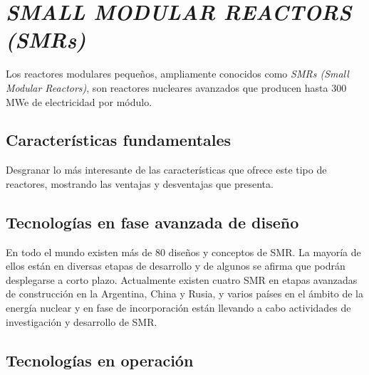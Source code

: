 \newpage
\section{\emph{SMALL MODULAR REACTORS (SMRs)}} \label{small_modular_reactors}

Los reactores modulares pequeños, ampliamente conocidos como \emph{SMRs (Small Modular Reactors)}, son reactores nucleares avanzados que producen hasta 300 MWe de electricidad por módulo. 

\subsection{Características fundamentales}

Desgranar lo más interesante de las características que ofrece este tipo de reactores, mostrando las ventajas y desventajas que presenta.

\subsection{Tecnologías en fase avanzada de diseño}

En todo el mundo existen más de 80 diseños y conceptos de SMR. La mayoría de ellos están en diversas etapas de desarrollo y de algunos se afirma que podrán desplegarse a corto plazo. Actualmente existen cuatro SMR en etapas avanzadas de construcción en la Argentina, China y Rusia, y varios países en el ámbito de la energía nuclear y en fase de incorporación están llevando a cabo actividades de investigación y desarrollo de SMR.

\subsection{Tecnologías en operación}